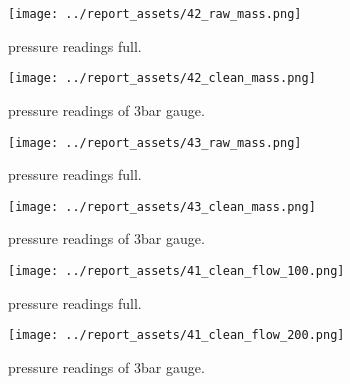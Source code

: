 \begin{figure}[htbp]
    \centering
    
    \begin{minipage}{0.45\textwidth}
        \centering
        \texttt{[image: ../report\_assets/42\_raw\_mass.png]}
        \caption{pressure readings full.}\label{fig:42_raw_mass}
    \end{minipage}
    \hfill
    \begin{minipage}{0.45\textwidth}
        \centering
        \texttt{[image: ../report\_assets/42\_clean\_mass.png]}
        \caption{pressure readings of 3bar gauge.}\label{fig:42_mass}
    \end{minipage}
    
\end{figure}

\begin{figure}[htbp]
    \centering
    
    \begin{minipage}{0.45\textwidth}
        \centering
        \texttt{[image: ../report\_assets/43\_raw\_mass.png]}
        \caption{pressure readings full.}\label{fig:43_raw_mass}
    \end{minipage}
    \hfill
    \begin{minipage}{0.45\textwidth}
        \centering
        \texttt{[image: ../report\_assets/43\_clean\_mass.png]}
        \caption{pressure readings of 3bar gauge.}\label{fig:43_mass}
    \end{minipage}
    
\end{figure}

\begin{figure}[htbp]
    \centering
    
    \begin{minipage}{0.45\textwidth}
        \centering
        \texttt{[image: ../report\_assets/41\_clean\_flow\_100.png]}
        \caption{pressure readings full.}\label{fig:41_flow_100}
    \end{minipage}
    \hfill
    \begin{minipage}{0.45\textwidth}
        \centering
        \texttt{[image: ../report\_assets/41\_clean\_flow\_200.png]}
        \caption{pressure readings of 3bar gauge.}\label{fig:41_flow_200}
    \end{minipage}
    
\end{figure}

